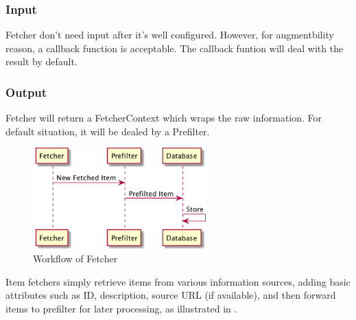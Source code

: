   \subsubsection{Input}
    Fetcher don't need input after it's well configured. However, for augmentbility reason, a callback function is acceptable.
    The callback funtion will deal with the result by default.

  \subsubsection{Output}
    Fetcher will return a FetcherContext which wraps the raw information. For default situation, it will be dealed by a Prefilter.

  \begin{figure}[H]
    \centering
    \includegraphics[width=0.6\textwidth]{img/fetch.png}
    \caption{Workflow of Fetcher \label{fig:fetcher}}
  \end{figure}


  Item fetchers simply retrieve items from various information sources,
  adding basic attributes such as ID, description, source URL (if
  available), and then forward items to prefilter for later processing, as illustrated in .

